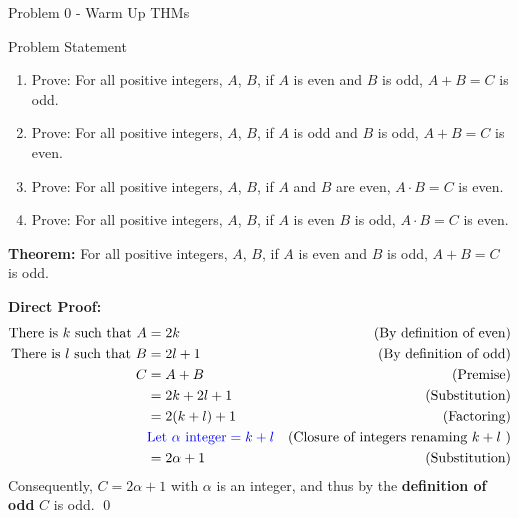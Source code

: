 \begin{problem}{Problem 0 - Warm Up THMs}
    \begin{statement}{Problem Statement}
        \begin{enumerate}[label=(\alph*)]
            \item Prove: For all positive integers, $A$, $B$, if $A$ is even and $B$ is odd, $A + B = C$ is odd.
            \item Prove: For all positive integers, $A$, $B$, if $A$ is odd and $B$ is odd, $A + B = C$ is even.
            \item Prove: For all positive integers, $A$, $B$, if $A$ and $B$ are even, $A \cdot B = C$ is even.
            \item Prove: For all positive integers, $A$, $B$, if $A$ is even $B$ is odd, $A \cdot B = C$ is even.
        \end{enumerate}
    \end{statement}

    \begin{highlight}
        \textbf{Theorem:} For all positive integers, $A$, $B$, if $A$ is even and $B$ is odd, $A + B = C$ is odd. \vspace*{1em}

        \textbf{Direct Proof:} \newline
        \begin{align*}
            \text{There is $k$ such that } A & = 2k & \text{(By definition of even)} \\
            \text{There is $l$ such that } B & = 2l + 1 & \text{(By definition of odd)} \\
            C & = A + B & \text{(Premise)} \\
            & = 2k + 2l + 1 & \text{(Substitution)} \\
            & = 2(k + l) + 1 & \text{(Factoring)} \\
            & \textcolor{blue}{\text{Let } \alpha \text{ integer} = k + l} & \text{(Closure of integers renaming $k + l$ )} \\
            & = 2\alpha + 1 & \text{(Substitution)} \\
        \end{align*}
        Consequently, $C = 2\alpha + 1$ with $\alpha$ is an integer, and thus by the \textbf{definition of odd} $C$ is odd. \qed
    \end{highlight}


\end{problem}
